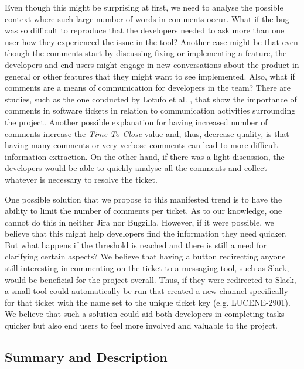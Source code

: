 \documentclass{mpaper}
\begin{document}
Even though this might be surprising at first, we need to analyse the possible context where such large 
number of words in comments occur. What if the bug was so difficult to reproduce that the developers needed to 
ask more than one user how they experienced the issue in the tool? Another case might be that even though 
the comments start by discussing fixing or implementing a feature, the developers and end users might 
engage in new conversations about the product in general or other features that they might want to see 
implemented. Also, what if comments are a means of communication for developers in the team? There are studies, 
such as the one conducted by Lotufo et al. \cite{lotufo2015modelling}, that show the importance of comments 
in software tickets in relation to communication activities surrounding the project. Another possible explanation 
for having increased number of comments increase the \emph{Time-To-Close} value and, thus, decrease quality, is that 
having many comments or very verbose comments can lead to more difficult information extraction. On the other 
hand, if there was a light discussion, the developers would be able to quickly analyse all the comments 
and collect whatever is necessary to resolve the ticket.

One possible solution that we propose to this manifested trend is to have the ability to limit the number of 
comments per ticket. As to our knowledge, one cannot do this in neither Jira nor Bugzilla. However, if it were 
possible, we believe that this might help developers find the information they need quicker. But what happens 
if the threshold is reached and there is still a need for clarifying certain aspects? We believe that having 
a button redirecting anyone still interesting in commenting on the ticket to a messaging tool, such as 
Slack, would be beneficial for the project overall. Thus, if they were redirected to Slack, a small 
tool could automatically be run that created a new channel specifically for that ticket with the name set 
to the unique ticket key (e.g. LUCENE-2901). We believe that such a solution could aid both developers in 
completing tasks quicker but also end users to feel more involved and valuable to the project.

\subsection{Summary and Description}
\end{document}
